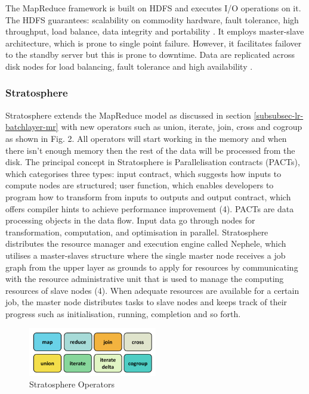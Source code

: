 The MapReduce framework is built on HDFS and executes I/O operations on it. The HDFS guarantees: scalability on commodity hardware, fault tolerance, high throughput, load balance, data integrity and portability \cite{intro-hdfs}. It employs master-slave architecture, which is prone to single point failure. However, it facilitates failover to the standby server but this is prone to downtime. Data are replicated across disk nodes for load balancing, fault tolerance and high availability \cite{intro-hdfs}.

\subsubsection{Stratosphere} \label{subsubsec-lr-batchlayer-stratosphere}
Stratosphere extends the MapReduce model as discussed in section \ref{subsubsec-lr-batchlayer-mr} with new operators such as union, iterate, join, cross and cogroup as shown in Fig. 2. All operators will start working in the memory and when there isn’t enough memory then the rest of the data will be processed from the disk. The principal concept in Stratosphere is Parallelisation contracts (PACTs), which categorises three types: input contract, which suggests how inputs to compute nodes are structured; user function, which enables developers to program how to transform from inputs to outputs and output contract, which offers compiler hints to achieve performance improvement (4). PACTs are data processing objects in the data flow. Input data go through nodes for transformation, computation, and optimisation in parallel. Stratosphere distributes the resource manager and execution engine called Nephele, which utilises a master-slaves structure where the single master node receives a job graph from the upper layer as grounds to apply for resources by communicating with the resource administrative unit that is used to manage the computing resources of slave nodes (4). When adequate resources are available for a certain job, the master node distributes tasks to slave nodes and keeps track of their progress such as initialisation, running, completion and so forth.

\begin{figure}[H]
\centering
\includegraphics[width=0.5\textwidth]{Figures/stratosphere.png}
\caption{Stratosphere Operators}\label{fig-stratosphere}
\end{figure}

